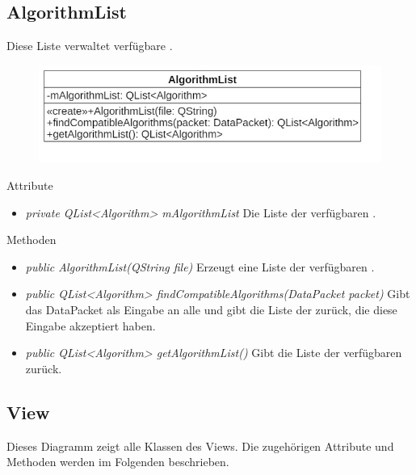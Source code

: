 \pagebreak

\subsection*{AlgorithmList}
Diese Liste verwaltet verfügbare .

\begin{figure}[H]
\centering
\includegraphics[scale=0.5]{img/Klassendiagramm/Klassen/Model/AlgorithmList}
\label{fig:algorithmList}
\end{figure}

Attribute
\begin{itemize}
\item\textit{private QList<Algorithm> mAlgorithmList} Die Liste der verfügbaren .
\end{itemize}

Methoden
\begin{itemize}
\item\textit{public AlgorithmList(QString file)} Erzeugt eine Liste der verfügbaren .
\item\textit{public QList<Algorithm> findCompatibleAlgorithms(DataPacket packet)} Gibt das DataPacket als Eingabe an alle  und gibt die Liste der  zurück, die diese Eingabe akzeptiert haben.
\item\textit{public QList<Algorithm> getAlgorithmList()} Gibt die Liste der verfügbaren  zurück.
\end{itemize}

\pagebreak

\subsection{View}

Dieses Diagramm zeigt alle Klassen des Views. Die zugehörigen Attribute und Methoden werden im Folgenden beschrieben.

